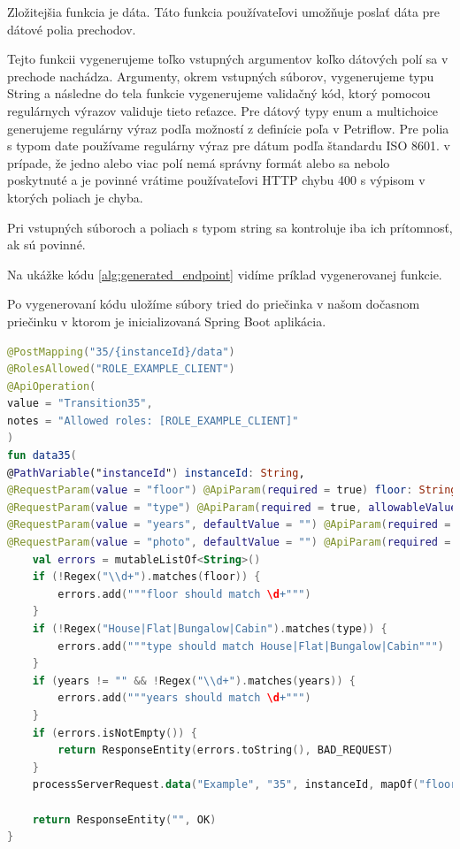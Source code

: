 
Zložitejšia funkcia je dáta. Táto funkcia používateľovi umožňuje poslať dáta pre dátové polia prechodov.  

Tejto funkcii vygenerujeme toľko vstupných argumentov koľko dátových polí sa v prechode nachádza. Argumenty, okrem vstupných súborov, vygenerujeme typu String a následne do tela funkcie vygenerujeme validačný kód, ktorý pomocou regulárnych výrazov validuje tieto reťazce. Pre dátový typy enum a multichoice generujeme regulárny výraz podľa možností z definície poľa v Petriflow. Pre polia s typom date používame regulárny výraz pre dátum podľa štandardu ISO 8601. v prípade, že jedno alebo viac polí nemá správny formát alebo sa nebolo poskytnuté a je povinné vrátime používateľovi HTTP chybu 400 s výpisom v ktorých poliach je chyba. 



Pri vstupných súboroch a poliach s typom string sa kontroluje iba ich prítomnosť, ak sú povinné. 

Na ukážke kódu \ref{alg:generated_endpoint} vidíme príklad vygenerovanej funkcie. 

Po vygenerovaní kódu uložíme súbory tried do priečinka v našom dočasnom priečinku v ktorom je inicializovaná Spring Boot aplikácia.   

\begin{lstlisting}[float, caption={Príklad vygenerovanej funkcie},label={alg:generated_endpoint},language=Kotlin] 
@PostMapping("35/{instanceId}/data") 
@RolesAllowed("ROLE_EXAMPLE_CLIENT") 
@ApiOperation( 
value = "Transition35", 
notes = "Allowed roles: [ROLE_EXAMPLE_CLIENT]" 
) 
fun data35( 
@PathVariable("instanceId") instanceId: String, 
@RequestParam(value = "floor") @ApiParam(required = true) floor: String, 
@RequestParam(value = "type") @ApiParam(required = true, allowableValues = """[House, Flat, Bungalow, Cabin]""") type: String, 
@RequestParam(value = "years", defaultValue = "") @ApiParam(required = false) years: String, 
@RequestParam(value = "photo", defaultValue = "") @ApiParam(required = false) photo: MultipartFile ): ResponseEntity<String> { 
	val errors = mutableListOf<String>() 
	if (!Regex("\\d+").matches(floor)) { 
		errors.add("""floor should match \d+""") 
	} 
	if (!Regex("House|Flat|Bungalow|Cabin").matches(type)) { 
		errors.add("""type should match House|Flat|Bungalow|Cabin""") 
	}
	if (years != "" && !Regex("\\d+").matches(years)) { 
		errors.add("""years should match \d+""") 
	} 
	if (errors.isNotEmpty()) { 
		return ResponseEntity(errors.toString(), BAD_REQUEST) 
	} 
	processServerRequest.data("Example", "35", instanceId, mapOf("floor" to floor, "type" to type, "years" to years, "photo" to photo )) 
	
	return ResponseEntity("", OK) 
} 
\end{lstlisting} 

